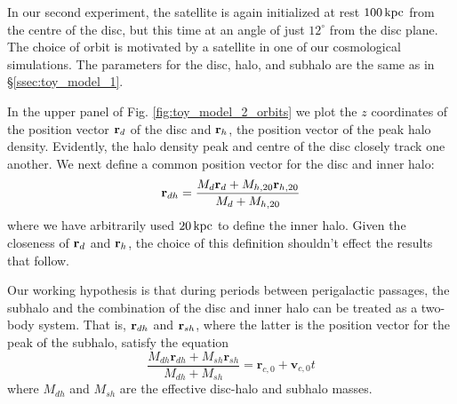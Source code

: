 In our second experiment, the satellite is again initialized at rest
$100\,{\rm kpc}$ from the centre of the disc, but this time at an
angle of just $12^\circ$ from the disc plane. The choice of orbit is
motivated by a satellite in one of our cosmological simulations. The
parameters for the disc, halo, and subhalo are the same as in
\S\ref{ssec:toy_model_1}.

In the upper panel of Fig. \ref{fig:toy_model_2_orbits} we plot the
$z$ coordinates of the position vector ${\bf r}_d$ of the disc and
${\bf r}_h$, the position vector of the peak halo density.  Evidently,
the halo density peak and centre of the disc closely track one
another. We next define a common position vector for the disc and
inner halo:
\begin{equation}
{\bf r}_{dh} = \frac{M_d {\bf r}_d + M_{h,20} {\bf r}_{h,20}}
{M_d + M_{h,20}}
\end{equation}
\noindent where we have arbitrarily used $20\,{\rm kpc}$ to define the
inner halo. Given the closeness of ${\bf r}_d$ and ${\bf r}_h$, the
choice of this definition shouldn't effect the results that follow.

Our working hypothesis is that during periods between perigalactic passages,
the subhalo and the combination of the disc and inner halo can be
treated as a two-body system. That is, ${\bf r}_{dh}$ and ${\bf
  r}_{sh}$, where the latter is the position vector for the peak of
the subhalo, satisfy the equation
\begin{equation}
\frac{M_{dh}\textbf{r}_{dh} + M_{sh} \textbf{r}_{sh}}{M_{dh} +
  M_{sh}} = \textbf{r}_{c,0} + \textbf{v}_{c,0} t
\end{equation}
where $M_{dh}$ and $M_{sh}$ are the effective disc-halo and subhalo masses.

